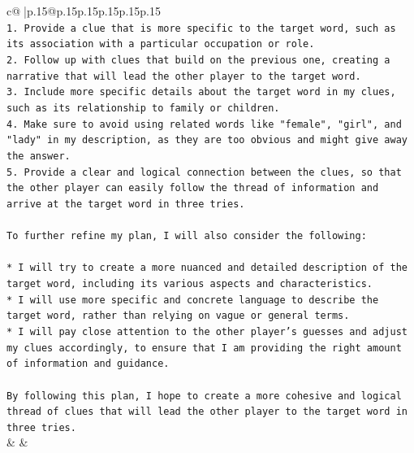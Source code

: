 \documentclass{article}
\begin{document}
{\begin{supertabular}{c@{$\;$}|p{.15\linewidth}@{}p{.15\linewidth}p{.15\linewidth}p{.15\linewidth}p{.15\linewidth}p{.15\linewidth}}
{{{\\ 
\texttt{1. Provide a clue that is more specific to the target word, such as its association with a particular occupation or role.} \\
\texttt{2. Follow up with clues that build on the previous one, creating a narrative that will lead the other player to the target word.} \\
\texttt{3. Include more specific details about the target word in my clues, such as its relationship to family or children.} \\
\texttt{4. Make sure to avoid using related words like "female", "girl", and "lady" in my description, as they are too obvious and might give away the answer.} \\
\texttt{5. Provide a clear and logical connection between the clues, so that the other player can easily follow the thread of information and arrive at the target word in three tries.} \\
\\ 
\texttt{To further refine my plan, I will also consider the following:} \\
\\ 
\texttt{* I will try to create a more nuanced and detailed description of the target word, including its various aspects and characteristics.} \\
\texttt{* I will use more specific and concrete language to describe the target word, rather than relying on vague or general terms.} \\
\texttt{* I will pay close attention to the other player's guesses and adjust my clues accordingly, to ensure that I am providing the right amount of information and guidance.} \\
\\ 
\texttt{By following this plan, I hope to create a more cohesive and logical thread of clues that will lead the other player to the target word in three tries.} \\
            }
        }
    }
    & & \\ \\


\end{supertabular}}
\end{document}
